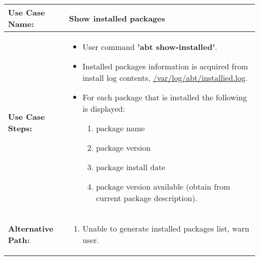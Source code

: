 \medskip

\begin{tabularx}{\linewidth}{|l|X|}
\hline
\textbf{Use Case Name:} & \textbf{Show installed packages} \\
\hline
\textbf{Use Case Steps:} & 
\begin{minipage}{\linewidth} 
  \vspace{0.05em}
  \begin{itemize}
    \item User command \textbf{'abt show-installed'}.
    \item Installed packages information is acquired from install log contents, \url{/var/log/abt/installied.log}.
    \item For each package that is installed the following is displayed:
    \begin{enumerate}
      \item package name
      \item package version
      \item package install date
      \item package version available (obtain from current package description).
    \end{enumerate}
  \end{itemize}
  \vspace{0.05em}
\end{minipage}
\\
\hline 
\textbf{Alternative Path:} &
\begin{minipage}{\linewidth}
  \vspace{0.05em} 
  \begin{enumerate}
    \item Unable to generate installed packages list, warn user.
  \end{enumerate}
  \vspace{0.05em} 
\end{minipage}
\\
\hline
\end{tabularx}
